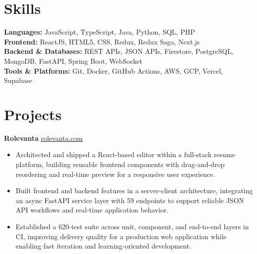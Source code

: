 \documentclass[11pt]{article}       %
\begin{document}
\vspace{-10.5pt}

\section*{Skills}
\textbf{Languages:} JavaScript, TypeScript, Java, Python, SQL, PHP \\
\textbf{Frontend:} ReactJS, HTML5, CSS, Redux, Redux Saga, Next.js \\
\textbf{Backend \& Databases:} REST APIs, JSON APIs, Firestore, PostgreSQL, MongoDB, FastAPI, Spring Boot, WebSocket \\
\textbf{Tools \& Platforms:} Git, Docker, GitHub Actions, AWS, GCP, Vercel, Supabase
\vspace{-5pt}






\section*{Projects}
\textbf{Rolevanta} \hfill \href{https://rolevanta.com}{rolevanta.com} \\
\vspace{-9pt}
\begin{itemize}
  \item Architected and shipped a React-based editor within a full-stack resume platform, building reusable frontend components with drag-and-drop reordering and real-time preview for a responsive user experience.
  \item Built frontend and backend features in a server-client architecture, integrating an async FastAPI service layer with 59 endpoints to support reliable JSON API workflows and real-time application behavior.
  \item Established a 620-test suite across unit, component, and end-to-end layers in CI, improving delivery quality for a production web application while enabling fast iteration and learning-oriented development.
\end{itemize}
\end{document}
